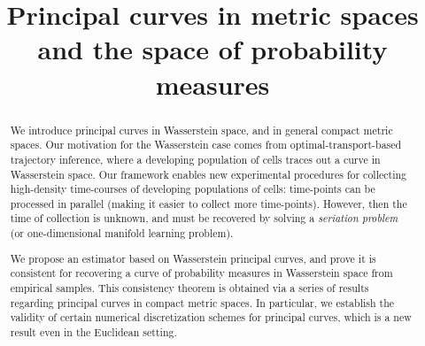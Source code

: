 \documentclass[aos, preprint]{imsart}
\theoremstyle{plain}
\theoremstyle{remark}
\begin{document}
\begin{frontmatter}
\title{ Principal curves in metric spaces and the space of probability measures}


\begin{abstract}


We introduce principal curves in Wasserstein space, and in general compact metric spaces.
Our motivation for the Wasserstein case comes from optimal-transport-based trajectory inference, where a developing population of cells traces out a curve in Wasserstein space.
Our framework enables new experimental procedures for collecting high-density time-courses of developing populations of cells:
time-points can be processed in parallel (making it easier to collect more time-points). However, then the time of collection is unknown, and must be recovered by solving a {\em seriation problem} (or one-dimensional manifold learning problem).

We propose an estimator based on Wasserstein principal curves, and prove it is consistent for recovering a curve of probability measures in Wasserstein space from empirical samples. This consistency theorem is obtained via a series of results regarding principal curves in compact metric spaces. In particular, we establish the validity of certain numerical discretization schemes for principal curves, which is a new result even in the Euclidean setting.

\end{abstract}

\begin{keyword}[class=MSC]
\end{keyword}

\begin{keyword}
\end{keyword}

\end{frontmatter}
\tableofcontents{}
\end{document}
